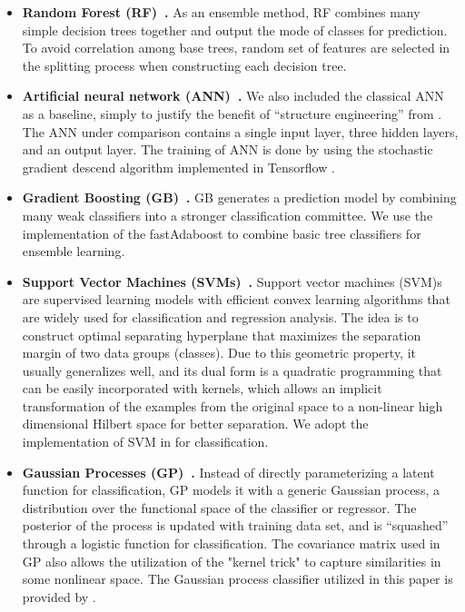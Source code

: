 \begin{itemize}
  \item
  \textbf{Random Forest (RF)~\cite{bib:liaw2002classification}.}
  As an ensemble method, RF combines many simple decision trees together and output the mode of classes for prediction.
  To avoid correlation among base trees, random set of features are selected in the splitting process when constructing each decision tree.

  \item
  \textbf{Artificial neural network (ANN)~\cite{bib:wang2003artificial}.}
  We also included the classical ANN as a baseline, simply to justify the benefit of ``structure engineering'' from \modelname. 
  The ANN under comparison contains a single input layer, three hidden layers, and an output layer. 
  The training of ANN is done by using the stochastic gradient descend algorithm implemented in Tensorflow \cite{bib:Tensorflow}.

  \item
  \textbf{Gradient Boosting (GB)~\cite{bib:friedman2002stochastic}.}
  GB generates a prediction model by combining many weak classifiers into a stronger classification committee.
  We use the implementation of the fastAdaboost \cite{bib:fastAdaboost} to combine basic tree classifiers for ensemble learning.

  \item
  \textbf{Support Vector Machines (SVMs)~\cite{bib:wang2005support}.}
  Support vector machines (SVM)s are supervised learning models with efficient convex learning algorithms that are widely used for classification and regression analysis.
  The idea is to construct optimal separating hyperplane that maximizes the separation margin of two data groups (classes).
  Due to this geometric property, it usually generalizes well, and its dual form is a quadratic programming that can be easily incorporated with kernels, which allows an implicit transformation of the examples from the original space to a non-linear high dimensional Hilbert space for better separation. 
  We adopt the implementation of SVM in \cite{bib:scikit-learn} for classification.

  \item
  \textbf{Gaussian Processes (GP)~\cite{bib:rasmussen2006gaussian}.}
  Instead of directly parameterizing a latent function for classification, GP models it with a generic Gaussian process, \ie a distribution over the functional space of the classifier or regressor.
  The posterior of the process is updated with training data set, and is ``squashed'' through a logistic function for classification. 
  The covariance matrix used in GP also allows the utilization of the "kernel trick" to capture similarities in some nonlinear space. 
  The Gaussian process classifier utilized in this paper is provided by \cite{bib:scikit-learn}.


\end{itemize}
